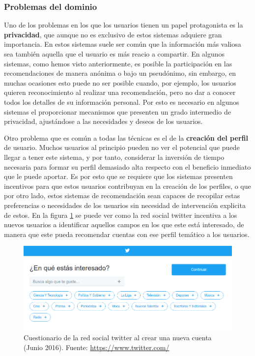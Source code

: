 \subsubsection{Problemas del dominio}
\label{sec:problemas}
Uno de los problemas en los que los usuarios tienen un papel protagonista es la \textbf{privacidad}, que aunque no es exclusivo de estos sistemas adquiere gran importancia. En estos sistemas suele ser común que la información más valiosa sea también aquella que el usuario es más reacio a compartir. En algunos sistemas, como hemos visto anteriormente, es posible la participación en las recomendaciones de manera anónima o bajo un pseudónimo\cite{Resnick:1994:GOA:192844.192905}, sin embargo, en muchas ocasiones esto puede no ser posible cuando, por ejemplo, los usuarios quieren reconocimiento al realizar una recomendación, pero no dar a conocer todos los detalles de su información personal. Por esto es necesario en algunos sistemas el proporcionar mecanismos que presenten un grado intermedio de privacidad, ajustándose a las necesidades y deseos de los usuarios. 

Otro problema que es común a todas las técnicas es el de la \textbf{creación del perfil} de usuario. Muchos usuarios al principio pueden no ver el potencial que puede llegar a tener este sistema, y por tanto, considerar la inversión de tiempo necesaria para formar su perfil demasiado alta respecto con el beneficio inmediato que le puede aportar. Es por esto que se requiere que los sistemas presenten incentivos para que estos usuarios contribuyan en la creación de los perfiles, o que por otro lado, estos sistemas de recomendación sean capaces de recopilar estas preferencias o necesidades de los usuarios sin necesidad de intervención explicita de estos. En la figura \ref{fig:twitter-interest} se puede ver como la red social twitter incentiva a los nuevos usuarios a identificar aquellos campos en los que este está interesado, de manera que este pueda recomendar cuentas con ese perfil temático a los usuarios.

\begin{figure}[!h]
\begin{center}
\includegraphics[width=1\textwidth]{./figures/twitter-interest.png}
\caption[Cuestionario de la red social twitter]{Cuestionario de la red social twitter al crear una nueva cuenta (Junio 2016). Fuente: \href{https://www.twitter.com/}{https://www.twitter.com/}}
\label{fig:twitter-interest}
\end{center}
\end{figure}

